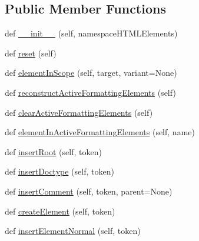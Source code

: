 \subsection*{Public Member Functions}
\begin{DoxyCompactItemize}
\item 
def \hyperlink{classpip_1_1__vendor_1_1html5lib_1_1treebuilders_1_1base_1_1TreeBuilder_a9c33de062da5ed869465f126e6d4c88c}{\+\_\+\+\_\+init\+\_\+\+\_\+} (self, namespace\+H\+T\+M\+L\+Elements)
\item 
def \hyperlink{classpip_1_1__vendor_1_1html5lib_1_1treebuilders_1_1base_1_1TreeBuilder_a40d63bb6edc4a5eb597ea2c87560b902}{reset} (self)
\item 
def \hyperlink{classpip_1_1__vendor_1_1html5lib_1_1treebuilders_1_1base_1_1TreeBuilder_a88ad7f356a5976550c53123fe596fc87}{element\+In\+Scope} (self, target, variant=None)
\item 
def \hyperlink{classpip_1_1__vendor_1_1html5lib_1_1treebuilders_1_1base_1_1TreeBuilder_a3756db0ab730a6d38644d688a0039737}{reconstruct\+Active\+Formatting\+Elements} (self)
\item 
def \hyperlink{classpip_1_1__vendor_1_1html5lib_1_1treebuilders_1_1base_1_1TreeBuilder_afadeb803b98c8bb43f2ec02bdea648f1}{clear\+Active\+Formatting\+Elements} (self)
\item 
def \hyperlink{classpip_1_1__vendor_1_1html5lib_1_1treebuilders_1_1base_1_1TreeBuilder_affe84410f05d992911a759223cf9d6b4}{element\+In\+Active\+Formatting\+Elements} (self, name)
\item 
def \hyperlink{classpip_1_1__vendor_1_1html5lib_1_1treebuilders_1_1base_1_1TreeBuilder_af7229f269b71c198d4ec7ebe86bcc255}{insert\+Root} (self, token)
\item 
def \hyperlink{classpip_1_1__vendor_1_1html5lib_1_1treebuilders_1_1base_1_1TreeBuilder_ae0fad78bc45bc5c32f4dcb2b7b7dc029}{insert\+Doctype} (self, token)
\item 
def \hyperlink{classpip_1_1__vendor_1_1html5lib_1_1treebuilders_1_1base_1_1TreeBuilder_a78f3c1f9a448cfea34c28ac0eb271b1e}{insert\+Comment} (self, token, parent=None)
\item 
def \hyperlink{classpip_1_1__vendor_1_1html5lib_1_1treebuilders_1_1base_1_1TreeBuilder_adfd2e95ee4afee8688b4da9197ca253d}{create\+Element} (self, token)
\item 
def \hyperlink{classpip_1_1__vendor_1_1html5lib_1_1treebuilders_1_1base_1_1TreeBuilder_a60e277927229d1cca5bc169918440739}{insert\+Element\+Normal} (self, token)
\item 

\end{DoxyCompactItemize}
